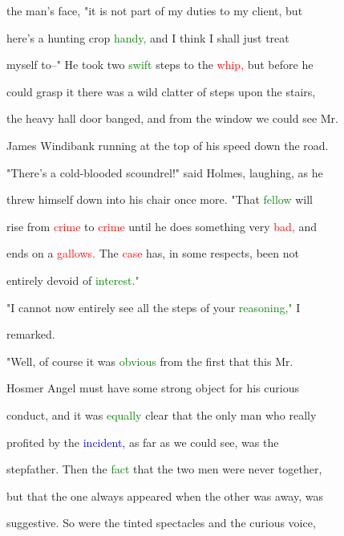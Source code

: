  the man's face, "it is not part of my duties to my client, but

 here's a hunting crop \textcolor{green}{handy,} and I think I shall just \textcolor{BurntOrange}{treat}

 myself to--" He took two \textcolor{green}{swift} steps to the \textcolor{red}{whip,} but before he

 could grasp it there was a \textcolor{BurntOrange}{wild} clatter of steps upon the stairs,

 the heavy hall door \textcolor{BurntOrange}{banged,} and from the window we could see Mr.

 James Windibank running at the \textcolor{BurntOrange}{top} of his speed down the road.



 "There's a cold-blooded \textcolor{BurntOrange}{scoundrel!"} said Holmes, \textcolor{BurntOrange}{laughing,} as he

 threw himself down into his chair once more. "That \textcolor{green}{fellow} will

 rise from \textcolor{red}{crime} to \textcolor{red}{crime} until he does something very \textcolor{red}{bad,} and

 ends on a \textcolor{red}{gallows.} The \textcolor{red}{case} has, in some \textcolor{BurntOrange}{respects,} been not

 entirely devoid of \textcolor{green}{interest."}



 "I cannot now entirely see all the steps of your \textcolor{green}{reasoning,"} I

 remarked.



 "Well, of course it was \textcolor{green}{obvious} from the first that this Mr.

 Hosmer \textcolor{BurntOrange}{Angel} must have some strong object for his curious

 conduct, and it was \textcolor{green}{equally} clear that the only man who really

 profited by the \textcolor{blue}{incident,} as far as we could see, was the

 stepfather. Then the \textcolor{green}{fact} that the two men were never together,

 but that the one always appeared when the other was away, was

 suggestive. So were the tinted \textcolor{BurntOrange}{spectacles} and the curious voice,

